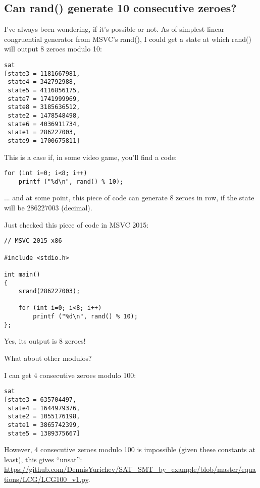 \subsection{Can rand() generate 10 consecutive zeroes?}

\renewcommand{\CURPATH}{equations/LCG}

I've always been wondering, if it's possible or not.
As of simplest linear congruential generator from MSVC's rand(), I could get a state at which rand() will output 8 zeroes modulo 10:



\begin{lstlisting}
sat
[state3 = 1181667981,
 state4 = 342792988,
 state5 = 4116856175,
 state7 = 1741999969,
 state8 = 3185636512,
 state2 = 1478548498,
 state6 = 4036911734,
 state1 = 286227003,
 state9 = 1700675811]
\end{lstlisting}

This is a case if, in some video game, you'll find a code:

\begin{lstlisting}
for (int i=0; i<8; i++)
    printf ("%d\n", rand() % 10);
\end{lstlisting}

... and at some point, this piece of code can generate 8 zeroes in row, if the state will be 286227003 (decimal).

Just checked this piece of code in MSVC 2015:

\begin{lstlisting}
// MSVC 2015 x86

#include <stdio.h>

int main()
{
	srand(286227003);

	for (int i=0; i<8; i++)
		printf ("%d\n", rand() % 10);
};
\end{lstlisting}

Yes, its output is 8 zeroes!

What about other modulos?

I can get 4 consecutive zeroes modulo 100:



\begin{lstlisting}
sat
[state3 = 635704497,
 state4 = 1644979376,
 state2 = 1055176198,
 state1 = 3865742399,
 state5 = 1389375667]
\end{lstlisting}

However, 4 consecutive zeroes modulo 100 is impossible (given these constants at least), this gives ``unsat'':
\url{https://github.com/DennisYurichev/SAT_SMT_by_example/blob/master/equations/LCG/LCG100_v1.py}.

